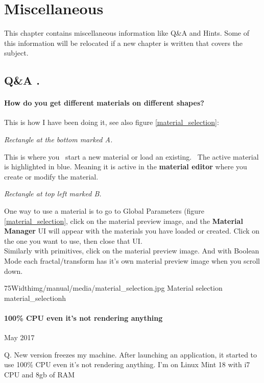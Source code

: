 \section{Miscellaneous}\label{miscellaneous}

This chapter contains miscellaneous information like  Q\&A and Hints. Some of this information will be relocated if a new chapter is written that covers the subject.


\subsection{Q\&A . }\label{Q|&A}

\paragraph{How do you get different materials on different
	shapes?}

This is how I have been doing it, see also figure \ref{material_selection}:

\emph{Rectangle at the bottom marked A.}

This is where you~ start a new material or load an
existing.~ The active material is highlighted in blue. Meaning it is active in
the \textbf{material editor} where you create or modify the material.

\emph{Rectangle at top left marked B.}

One way to use a material is to go to Global Parameters (figure \ref{material_selection},
click on the material preview image, and the \textbf{Material Manager} UI will
appear with the materials you have loaded or created. Click on the one you want
to use, then close that UI.\\ Similarly with primitives, click on the material
preview image. And with Boolean Mode each fractal/transform has it's own
material preview image when you scroll down.

\simpleImageWithCaption75Width{img/manual/media/material_selection.jpg}
{Material selection}
{material_selection}{h}


\paragraph{100\% CPU even it's not rendering anything} May 2017

Q. New version freezes my machine. After launching an application, it started  to use 100\% CPU even it's not rendering anything.
I'm on Linux Mint 18 with i7 CPU and 8gb of RAM


